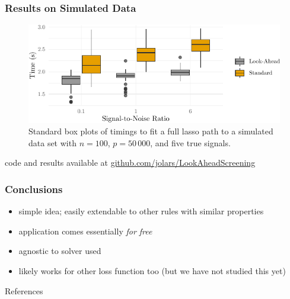 \documentclass[10pt,ignorenonframetext]{beamer}
\newif\ifbibliography
\begin{document}
\begin{frame}[c]
  \frametitle{Results on Simulated Data}
  \begin{figure}[hbtp]
    \centering
    \includegraphics[width=\textwidth]{images/simulated-data-timings.pdf}
    \caption{Standard box plots of timings to fit a full lasso path to
      a simulated data set with \(n = 100\), \(p = 50\,000\), and five
      true
      signals.}
    \label{fig:simulated-data}
  \end{figure}

  code and results available at
  \href{https://github.com/jolars/LookAheadScreening}{github.com/jolars/LookAheadScreening} 
\end{frame}

\begin{frame}[c]
  \frametitle{Conclusions}
  \begin{itemize}
    \item simple idea; easily extendable to other rules with similar properties
    \item application comes essentially \emph{for free}
    \item agnostic to solver used
    \item likely works for other loss function too (but we have not studied this
          yet)
  \end{itemize}
\end{frame}

\begin{frame}[allowframebreaks]{References}
  \bibliographytrue
  \printbibliography[heading=none]
\end{frame}
\end{document}
